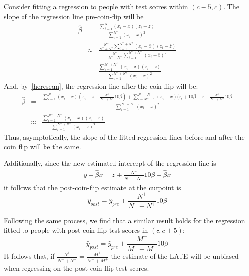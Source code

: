\documentclass{article}
\begin{document}
\begin{itemize}
\begin{itemize}
       Consider fitting a regression to people with test scores 
       within $(c-5,c)$.
       The slope of the regression line pre-coin-flip will be
       \begin{eqnarray*}
         \hat\beta& =&\frac{\sum_{i=1}^{N^-} (x_i - \bar x)(z_i - \bar z) }{ \sum_{i=1}^{N^-} (x_i - \bar x)^2}\\
            &\approx&\frac{ \frac{N^-}{N^- + N^+}\sum_{i=1}^{N^-+N^+} (x_i - \bar x)(z_i - \bar z) }
            { \frac{N^-}{N^- + N^+}\sum_{i=1}^{N^- + N^+} (x_i - \bar x)^2} \\
         &=& \frac{\sum_{i=1}^{N^-+N^+} (x_i - \bar x)(z_i - \bar z)}{\sum_{i=1}^{N^- + N^+} (x_i - \bar x)^2}
       \end{eqnarray*}
       And, by~\eqref{hereseqn}, the regression line after the coin flip will be:
       \begin{eqnarray*}
         \hat\beta&=&\frac{
           \sum_{i=1}^{N^-} (x_i - \bar x)(z_i - \bar z - \frac{N^+}{N^-+N^+}10\beta ) +
              \sum_{i=N^-+1}^{N^-+N^+} (x_i - \bar x)(z_i + 10\beta - \bar z - \frac{N^+}{N^-+N^+}10\beta}
             {\sum_{i=1}^{N^- + N^+} (x_i - \bar x)^2}\\
            &\approx&
            \frac{\sum_{i=1}^{N^-+N^+} (x_i - \bar x)(z_i - \bar z)}{\sum_{i=1}^{N^- + N^+} (x_i - \bar x)^2}
       \end{eqnarray*}
       Thus, asymptotically, the slope of the fitted regression lines before and after the coin flip
       will be the same.
       
       Additionally, since the new estimated intercept of the regression line is
       \begin{eqnarray*}
          \bar y - \hat\beta \bar x = 
          \bar z + \frac{N^+}{N^-+N^+}10\beta - \hat\beta\bar x
       \end{eqnarray*}
       it follows that the post-coin-flip estimate at the cutpoint is
       $$
         \hat y_{post} = \hat y_{pre}+ \frac{N^+}{N^-+N^+}10\beta 
       $$ 
       
       Following the same process, we find that
       a similar result holds for the regression fitted to people 
       with post-coin-flip test scores
       in $(c,c+5)$:
       $$
         \hat y_{post} = \hat y_{pre}+ \frac{M^+}{M^-+M^+}10\beta 
       $$
       It follows that, if $\frac{N^+}{N^-+N^+} =  \frac{M^+}{M^-+M^+}$
       the estimate of the LATE will be unbiased when regressing on the
       post-coin-flip test scores.
     \end{itemize}
\end{itemize}     
\end{document}
